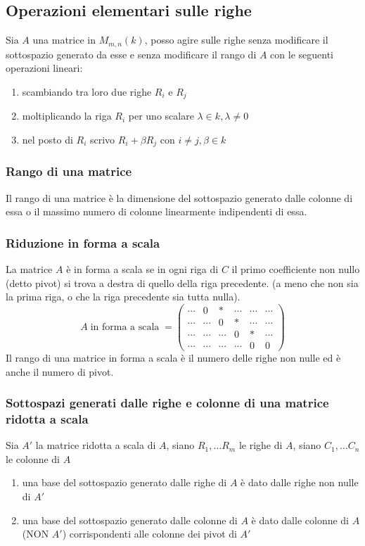 \documentclass[a4paper]{article}
\begin{document}
\subsection{Operazioni elementari sulle righe}
Sia \(A\) una matrice in \(M_{m,n}(k)\), posso agire sulle righe senza modificare il sottospazio generato da esse e senza modificare
il rango di \(A\) con le seguenti operazioni lineari:
\begin{enumerate}[topsep=3pt, itemsep=0pt]
	\item scambiando tra loro due righe \(R_i\) e \(R_j\)
	\item moltiplicando la riga \(R_i\) per uno scalare \(\lambda \in k, \lambda \neq 0\)
	\item nel posto di \(R_i\) scrivo \(R_i + \beta R_j\) con \(i \neq j, \beta \in k\)
\end{enumerate}

\subsubsection*{Rango di una matrice}
Il rango di una matrice è la dimensione del sottospazio generato dalle colonne di essa o il massimo numero di colonne linearmente
indipendenti di essa.

\subsubsection*{Riduzione in forma a scala}
La matrice \(A\) è in forma a scala se in ogni riga di \(C\) il primo coefficiente non nullo (detto pivot) si trova a destra di
quello della riga precedente. (a meno che non sia la prima riga, o che la riga precedente sia tutta nulla).
\[A \; \text{in forma a scala} \;  = \begin{pmatrix}
	\cdots & 0 & * & \cdots & \cdots & \cdots \\
	\cdots & \cdots & 0 & * & \cdots & \cdots \\
	\cdots & \cdots & \cdots & 0 & * & \cdots \\
	\cdots & \cdots & \cdots & \cdots & 0 & 0
\end{pmatrix}\]
Il rango di una matrice in forma a scala è il numero delle righe non nulle ed è anche il numero di pivot.

\subsubsection*{Sottospazi generati dalle righe e colonne di una matrice ridotta a scala}
Sia \(A'\) la matrice ridotta a scala di \(A\), siano \(R_1, \dots R_m\) le righe di \(A\), siano \(C_1, \dots C_n\) le colonne di \(A\)
\begin{enumerate}
	\item una base del sottospazio generato dalle righe di \(A\) è dato dalle righe non nulle di \(A'\)
	\item una base del sottospazio generato dalle colonne di \(A\) è dato dalle colonne di \(A\) (NON \(A'\)) corrispondenti alle
	colonne dei pivot di \(A'\)
\end{enumerate}
\end{document}
